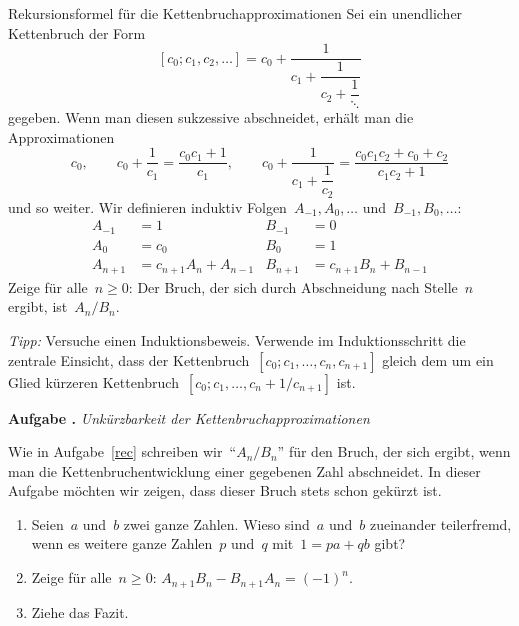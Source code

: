 \documentclass[a4paper,ngerman,twoside]{scrartcl}
\newlength{\aufgabenskip}
\newcounter{aufgabennummer}
\newenvironment{aufgabe}[1]{
  \addtocounter{aufgabennummer}{1}
  \textbf{Aufgabe \theaufgabennummer.} \emph{#1} \par
}{\vspace{\aufgabenskip}}
\newenvironment{aufgabe*}[1]{
  \addtocounter{aufgabennummer}{1}
  \textbf{Aufgabe* \theaufgabennummer.} \emph{#1} \par
}{\vspace{\aufgabenskip}}
\begin{document}
\begin{aufgabe*}{Rekursionsformel für die Kettenbruchapproximationen}\label{rec}
Sei ein unendlicher Kettenbruch der Form
\[ [c_0;c_1,c_2,\ldots] = c_0 + \dfrac{1}{c_1 + \dfrac{1}{c_2 + \dfrac{1}{\ddots}}} \]
gegeben. Wenn man diesen sukzessive abschneidet, erhält man die Approximationen
\[ c_0, \qquad
  c_0 + \dfrac{1}{c_1} = \frac{c_0c_1 + 1}{c_1}, \qquad
  c_0 + \dfrac{1}{c_1 + \dfrac{1}{c_2}} = \frac{c_0c_1c_2 + c_0 +
  c_2}{c_1c_2+1}
\]
und so weiter. Wir definieren induktiv Folgen~$A_{-1},A_0,\ldots$
und~$B_{-1},B_0,\ldots$:
\begin{align*}
  A_{-1} &= 1 & B_{-1} &= 0 \\
  A_0 &= c_0 & B_0 &= 1 \\
  A_{n+1} &= c_{n+1} A_n + A_{n-1} & B_{n+1} &= c_{n+1} B_n + B_{n-1}
\end{align*}
Zeige für alle~$n \geq 0$: Der Bruch, der sich durch Abschneidung nach
Stelle~$n$ ergibt, ist~$A_n/B_n$.

\emph{Tipp:} Versuche einen Induktionsbeweis. Verwende im Induktionsschritt die
zentrale Einsicht, dass der Kettenbruch~$[c_0;c_1,\ldots,c_n,c_{n+1}]$ gleich
dem um ein Glied kürzeren Kettenbruch~$[c_0;c_1,\ldots,c_n+1/c_{n+1}]$ ist.
\end{aufgabe*}

\begin{aufgabe}{Unkürzbarkeit der Kettenbruchapproximationen}
Wie in Aufgabe~\ref{rec} schreiben wir~"`$A_n/B_n$"' für den Bruch, der sich
ergibt, wenn man die Kettenbruchentwicklung einer gegebenen Zahl abschneidet.
In dieser Aufgabe möchten wir zeigen, dass dieser Bruch stets schon gekürzt
ist.
\begin{enumerate}
\item Seien~$a$ und~$b$ zwei ganze Zahlen. Wieso sind~$a$ und~$b$ zueinander
teilerfremd, wenn es weitere ganze Zahlen~$p$ und~$q$ mit~$1 = pa + qb$ gibt?
\item Zeige für alle~$n \geq 0$: $A_{n+1} B_n - B_{n+1} A_n = (-1)^n$.
\item Ziehe das Fazit.
\end{enumerate}
\end{aufgabe}
\end{document}
